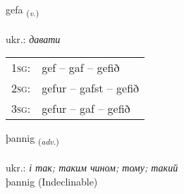 \documentclass[frontgrid, backgrid]{flacards}\usepackage[]{graphicx}\usepackage[]{xcolor}
\begin{document}
\renewcommand{\flhead}{\vskip5pt \fboxsep=0pt {\small\bfseries\footnotesize Sagnorð | дієслово}}
\renewcommand{\fcfoot}{\vskip5pt \fboxsep=0pt \hspace{2pt}{\small\bfseries\footnotesize 1K}}

\renewcommand{\blhead}{\vskip5pt {\small\bfseries\footnotesize Sagnorð | дієслово }}
\renewcommand{\bcfoot}{\vskip5pt \hspace{2pt}{\small\bfseries\footnotesize 1K}}


{gefa \small{\textsubscript{(\textit{v.})}} \\[1ex] %
\textphonetic{[cɛːva]} \\
ukr.: \emph{давати} \\  [2ex]
\renewcommand*{\arraystretch}{0.8}
\begin{tabular}{p{1cm}l}
\textsc{1sg}: & gef -- gaf -- gefið \\ 
\textsc{2sg}: & gefur -- gafst -- gefið \\ 
\textsc{3sg}: & gefur -- gaf -- gefið \\ 
\end{tabular}
}


\renewcommand{\flhead}{\vskip5pt \fboxsep=0pt {\small\bfseries\footnotesize Atviksorð | прислівник}}
\renewcommand{\fcfoot}{\vskip5pt \fboxsep=0pt \hspace{2pt}{\small\bfseries\footnotesize 1K}}

\renewcommand{\blhead}{\vskip5pt {\small\bfseries\footnotesize Atviksorð | прислівник }}
\renewcommand{\bcfoot}{\vskip5pt \hspace{2pt}{\small\bfseries\footnotesize 1K}}


{þannig \small{\textsubscript{(\textit{adv.})}} \\[1ex]
\textphonetic{[θanɪɣ]} \\
ukr.: \emph{і так; таким чином; тому; такий} \\  [2ex]
þannig (Indeclinable)}
\end{document}

